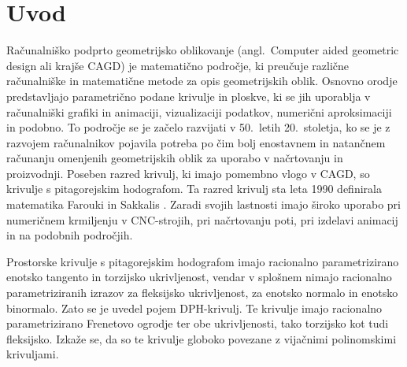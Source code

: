 \documentclass[12pt,a4paper,twoside]{article}
\theoremstyle{definition} %
\theoremstyle{plain} %
\theoremstyle{primerstyle}
\numberwithin{equation}{section}  %
\begin{document}
\section{Uvod}
Računalniško podprto geometrijsko oblikovanje (angl.\ Computer aided geometric design ali krajše CAGD) je matematično področje, ki preučuje različne računalniške in matematične metode za opis geometrijskih oblik. Osnovno orodje predstavljajo parametrično podane krivulje in ploskve, ki se jih uporablja v računalniški grafiki in animaciji, vizualizaciji podatkov, numerični aproksimaciji in podobno. To področje se je začelo razvijati v 50.\ letih 20.\ stoletja, ko se je z razvojem računalnikov pojavila potreba po čim bolj enostavnem in natančnem računanju omenjenih geometrijskih oblik za uporabo v načrtovanju in proizvodnji. Poseben razred krivulj, ki imajo pomembno vlogo v CAGD, so krivulje s pitagorejskim hodografom. Ta razred krivulj sta leta 1990 definirala matematika Farouki in Sakkalis \cite{farouki1990pythagorean}. Zaradi svojih lastnosti imajo široko uporabo pri numeričnem krmiljenju v CNC-strojih, pri načrtovanju poti, pri izdelavi animacij in na podobnih področjih.

Prostorske krivulje s pitagorejskim hodografom imajo racionalno parametrizirano enotsko tangento in torzijsko ukrivljenost, vendar v splošnem nimajo racionalno parametriziranih izrazov za fleksijsko ukrivljenost, za enotsko normalo in enotsko binormalo. Zato se je uvedel pojem DPH-krivulj. Te krivulje imajo racionalno parametrizirano Frenetovo ogrodje ter obe ukrivljenosti, tako torzijsko kot tudi fleksijsko. Izkaže se, da so te krivulje globoko povezane z vijačnimi polinomskimi krivuljami.
\end{document}
